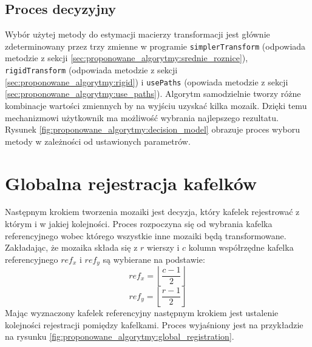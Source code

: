 \subsection{Proces decyzyjny}
\label{sec:proponowane_algorytmy:proces_decyzyjny}

Wybór użytej metody do estymacji macierzy transformacji jest głównie zdeterminowany przez trzy zmienne w programie \texttt{simplerTransform} (odpowiada metodzie z sekcji \ref{sec:proponowane_algorytmy:srednie_roznice}), \texttt{rigidTransform} (odpowiada metodzie z sekcji \ref{sec:proponowane_algorytmy:rigid}) i \texttt{usePaths} (opowiada metodzie z sekcji \ref{sec:proponowane_algorytmy:use_paths}). Algorytm samodzielnie tworzy różne kombinacje wartości zmiennych by na wyjściu uzyskać kilka mozaik. Dzięki temu mechanizmowi użytkownik ma możliwość wybrania najlepszego rezultatu. Rysunek \ref{fig:proponowane_algorytmy:decision_model} obrazuje proces wyboru metody w zależności od ustawionych parametrów.

\section{Globalna rejestracja kafelków}
\label{sec:proponowane_algorytmy:globalna_rejestracja}

Następnym krokiem tworzenia mozaiki jest decyzja, który kafelek rejestrować z którym i w jakiej kolejności. Proces rozpoczyna się od wybrania kafelka referencyjnego wobec którego wszystkie inne mozaiki będą transformowane. Zakładając, że mozaika składa się z $r$ wierszy i $c$ kolumn współrzędne kafelka referencyjnego $ref_x$ i $ref_y$ są wybierane na podstawie:
\begin{equation}
ref_x = \left \lfloor\frac{c - 1}{2}\right \rfloor
\label{eq:ref_x}
\end{equation}
\begin{equation}
ref_y = \left \lfloor\frac{r - 1}{2}\right \rfloor
\label{eq:ref_y}
\end{equation}
Mając wyznaczony kafelek referencyjny następnym krokiem jest ustalenie kolejności rejestracji pomiędzy kafelkami. Proces wyjaśniony jest na przykładzie na rysunku \ref{fig:proponowane_algorytmy:global_registration}.


